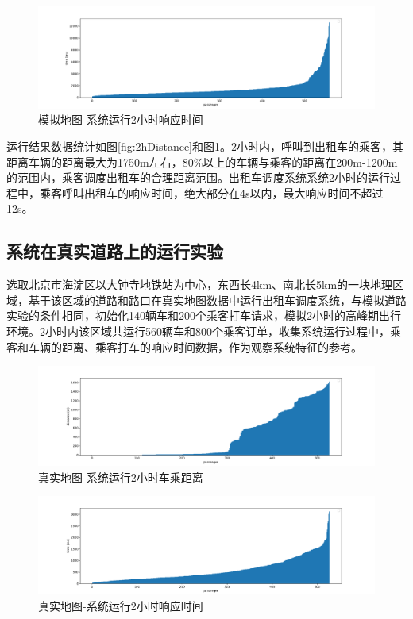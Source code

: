 \begin{figure}[h]
  \centering
  \includegraphics[width=1.0\textwidth]{figures/2hTime}
  \caption{模拟地图-系统运行2小时响应时间}\label{fig:2hTime}
\end{figure}

运行结果数据统计如图\ref{fig:2hDistance}和图\ref{fig:2hTime}。2小时内，呼叫到出租车的乘客，其距离车辆的距离最大为1750m左右，80$\%$以上的车辆与乘客的距离在200m-1200m的范围内，乘客调度出租车的合理距离范围。出租车调度系统系统2小时的运行过程中，乘客呼叫出租车的响应时间，绝大部分在4s以内，最大响应时间不超过12s。

\subsection{系统在真实道路上的运行实验}
选取北京市海淀区以大钟寺地铁站为中心，东西长4km、南北长5km的一块地理区域，基于该区域的道路和路口在真实地图数据中运行出租车调度系统，与模拟道路实验的条件相同，初始化140辆车和200个乘客打车请求，模拟2小时的高峰期出行环境。2小时内该区域共运行560辆车和800个乘客订单，收集系统运行过程中，乘客和车辆的距离、乘客打车的响应时间数据，作为观察系统特征的参考。

\begin{figure}[h]
  \centering
  \includegraphics[width=1.0\textwidth]{figures/real_2hDistance}
  \caption{真实地图-系统运行2小时车乘距离}\label{fig:real_2hDistance}
\end{figure}

\begin{figure}[h]
  \centering
  \includegraphics[width=1.0\textwidth]{figures/real_2hTime}
  \caption{真实地图-系统运行2小时响应时间}\label{fig:real_2hTime}
\end{figure}

